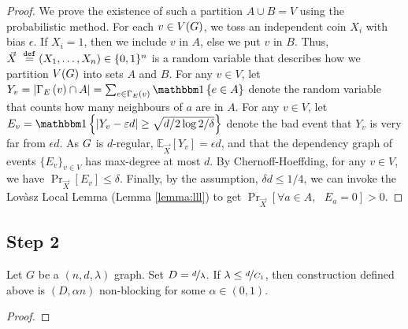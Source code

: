 \documentclass[11pt]{article}
\newcommand{\EnDeeLambda}{(n, d, \lambda)}
\newcommand{\EdgesShort}{E}
\newcommand{\Mean}[2]{\mathbb{E}_{#1}\left[#2\right]}
\newcommand{\PProb}[2]{\Pr_{#2}\left[#1 \right]}
\begin{document}
\begin{proof}We prove the existence of such a partition $A \cup B = V$ using the probabilistic method.
For each $v \in V(G)$, we toss an independent coin $X_i$ with bias $\epsilon$.
If $X_i = 1$, then we include $v$ in $A$, else we put $v$ in $B$.
Thus, $\vec{X} \text{ }\overset{\mathtt{def}}{=} (X_1, \dots, X_n) \in \{0,1\}^n$ is a random variable that describes how we partition $V(G)$ into sets $A$ and $B$.
For any $v \in V$, let $Y_v = |\Neighbourhood{\EdgesShort}{v} \cap A| = \sum_{e \in \Neighbourhood{E}{v}} \Indicator{e \in A}$ denote the random variable that counts how many neighbours of $a$ are in $A$.
For any $v \in V$, let $E_v = \Indicator{|Y_v -\epsilon d| \geq \sqrt{d/2\log 2/\delta}}$ denote the bad event that $Y_v$ is very far from $\epsilon d$.
As $G$ is $d$-regular, $\Mean{\vec{X}}{Y_v} = \epsilon d$, and that the dependency graph of events $\{ E_v \}_{v \in V}$ has max-degree at most $d$.
By Chernoff-Hoeffding, for any $v \in V$, we have $\PProb{E_v}{\vec{X}} \leq \delta$.
Finally, by the assumption, $\delta d \leq 1/4$, we can 
invoke the Lov\`asz Local Lemma (Lemma \ref{lemma:lll}) to get $\PProb{\forall a \in A, \text{ } E_a = 0}{\vec{X}} > 0$.
\end{proof}



\subsection{Step 2}

\begin{lemma}\label{lemma:bipartitie-is-non-blocking}Let $G$ be a $\EnDeeLambda$ graph. Set $D = \nicefrac{d}{\lambda}$. If $\lambda \leq \nicefrac{d}{C_1}$, then construction defined above is $(D, \alpha n)$ non-blocking for some $\alpha \in (0,1)$.
\end{lemma}
\begin{proof}
	
\end{proof}
\end{document}
